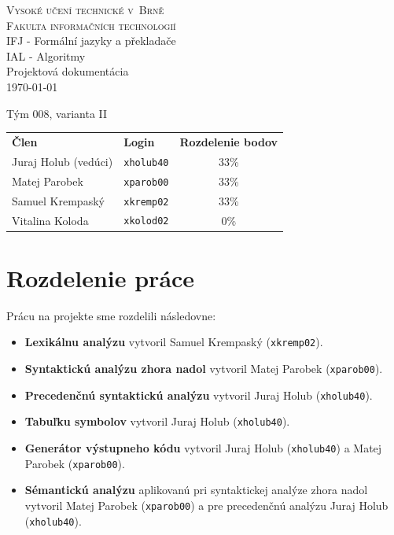 \documentclass[a4paper, 11pt]{article}
\author{Juraj Holub}
\date{}
\begin{document}
\begin{titlepage}
\begin{center}
	\Huge
	\textsc{\Huge{Vysoké učení technické v~Brně} \\
	\huge{ Fakulta informačních technologií}} \\
	\LARGE{IFJ - Formální jazyky a překladače} \\
	\LARGE{IAL - Algoritmy} \\
	\Huge{Projektová dokumentácia} \\
	\Large{\today}
	\setlength{\parindent}{0.3em}

	{\Large Tým 008, varianta II} \\
	
\begin{table}[H]
	\Large
	\centering
	\begin{tabular}{llc}
		\textbf{Člen}        & \textbf{Login} & \textbf{Rozdelenie bodov} \\
		Juraj Holub (vedúci) & \texttt{xholub40}       & 33\%                      \\
		Matej Parobek        & \texttt{xparob00}       & 33\%                      \\
		Samuel Krempaský      & \texttt{xkremp02}      & 33\%                      \\
		Vitalina Koloda      & \texttt{xkolod02}       & 0\%                      
	\end{tabular}
\end{table}
		
\end{center}
\end{titlepage}

{\hypersetup{hidelinks}\tableofcontents}
\newpage

\section{Rozdelenie práce}

Prácu na projekte sme rozdelili následovne:
\begin{itemize}
	\item{\textbf{Lexikálnu analýzu} vytvoril Samuel Krempaský (\texttt{xkremp02}).}
	\item{\textbf{Syntaktickú analýzu zhora nadol} vytvoril Matej Parobek (\texttt{xparob00}).}
	\item{\textbf{Precedenčnú syntaktickú analýzu} vytvoril Juraj Holub (\texttt{xholub40}).}
	\item{\textbf{Tabuľku symbolov} vytvoril Juraj Holub (\texttt{xholub40}).}
	\item{\textbf{Generátor výstupneho kódu} vytvoril Juraj Holub (\texttt{xholub40}) a Matej Parobek (\texttt{xparob00}).}
	\item{\textbf{Sémantickú analýzu} aplikovanú pri syntaktickej analýze zhora nadol vytvoril Matej Parobek (\texttt{xparob00}) a pre precedenčnú analýzu Juraj Holub (\texttt{xholub40}).}
\end{itemize}
\end{document}
